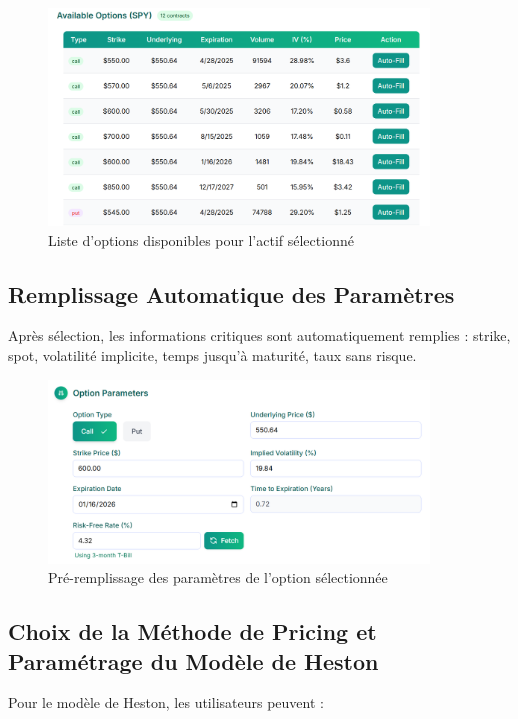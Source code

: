 \begin{figure}[H] \centering \includegraphics[width=0.9\textwidth]{images/3.png} \caption{Liste d'options disponibles pour l'actif sélectionné} \end{figure}

\subsection{Remplissage Automatique des Paramètres}

Après sélection, les informations critiques sont automatiquement remplies : strike, spot, volatilité implicite, temps jusqu'à maturité, taux sans risque.

\begin{figure}[H] \centering \includegraphics[width=0.9\textwidth]{images/4.png} \caption{Pré-remplissage des paramètres de l'option sélectionnée} \end{figure}

\subsection{Choix de la Méthode de Pricing et Paramétrage du Modèle de Heston}

Pour le modèle de Heston, les utilisateurs peuvent :

